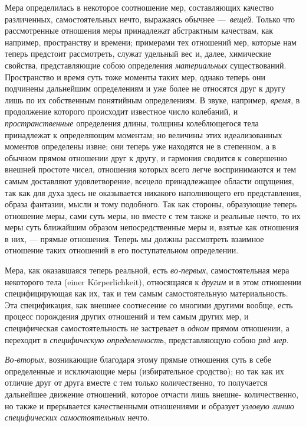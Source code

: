 
Мера определилась в некоторое соотношение мер,
составляющих качество различенных, самостоятельных нечто, выражаясь обычнее
—~{\em вещей}. Только что рассмотренные отношения меры
принадлежат абстрактным качествам, как например, пространству и времени;
примерами тех отношений мер, которые нам теперь предстоит рассмотреть,
служат удельный вес и, далее, химические свойства, представляющие собою
определения {\em материальных} существований.
Пространство и время суть тоже моменты таких мер, однако теперь они
подчинены дальнейшим определениям и уже более не относятся друг к другу
лишь по их собственным понятийным определениям. В звуке, например,
{\em время}, в продолжение которого происходит
известное число колебаний, и {\em пространственные}
определения длины, толщины колеблющегося тела принадлежат к определяющим
моментам; но величины этих идеализованных моментов определены извне; они
теперь уже находятся не в степенном, а в обычном прямом отношении друг к
другу, и гармония сводится к совершенно внешней простоте чисел, отношения
которых всего легче воспринимаются и тем самым доставляют удовлетворение,
всецело принадлежащее области ощущения, так как для духа здесь не
оказывается никакого наполняющего его представления, образа фантазии, мысли
и тому подобного. Так как стороны, образующие теперь отношение меры, сами
суть меры, но вместе с тем также и реальные нечто, то их меры суть
ближайшим образом непосредственные меры и, взятые как отношения в них, —
прямые отношения. Теперь мы должны рассмотреть взаимное отношение таких
отношений в его поступательном определении.

Мера, как оказавшаяся теперь реальной, есть
{\em во-первых}, самостоятельная мера некоторого тела
(einer Körperlichkeit), относящаяся к {\em другим} и в
этом отношении специфицирующая как их, так и тем самым самостоятельную
материальность. Эта спецификация, как внешнее соотнесение со многими
другими вообще, есть процесс порождения других отношений и тем самым других
мер, и специфическая самостоятельность не застревает в
{\em одном} прямом отношении, а переходит в
{\em специфическую определенность}, представляющую
собою {\em ряд мер}.

{\em Во-вторых}, возникающие благодаря этому прямые
отношения суть в себе определенные и исключающие меры (избирательное
сродство); но так как их отличие друг от друга вместе с тем только
количественно, то получается дальнейшее движение отношений, которое отчасти
лишь внешне- количественно, но также и прерывается качественными
отношениями и образует {\em узловую линию специфических
самостоятельных} нечто.

